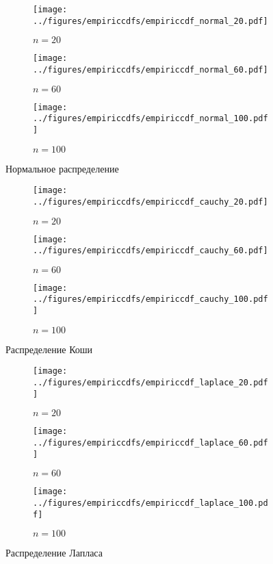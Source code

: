 \documentclass[12pt]{report}
\begin{document}
	\begin{figure}[H]
		\centering
		\begin{subfigure}[t]{.3\linewidth}
			\centering\texttt{[image: ../figures/empiriccdfs/empiriccdf\_normal\_20.pdf]}
			\caption*{$n = 20$}
		\end{subfigure}
		\begin{subfigure}[t]{.3\linewidth}
			\centering\texttt{[image: ../figures/empiriccdfs/empiriccdf\_normal\_60.pdf]}
			\caption*{$n = 60$}
		\end{subfigure}
		\begin{subfigure}[t]{.3\linewidth}
			\centering\texttt{[image: ../figures/empiriccdfs/empiriccdf\_normal\_100.pdf]}
			\caption*{$n = 100$}
		\end{subfigure}
		\caption{Нормальное распределение}
	\end{figure}
	\begin{figure}[H]
		\centering
		\begin{subfigure}[t]{.3\linewidth}
			\centering\texttt{[image: ../figures/empiriccdfs/empiriccdf\_cauchy\_20.pdf]}
			\caption*{$n = 20$}
		\end{subfigure}
		\begin{subfigure}[t]{.3\linewidth}
			\centering\texttt{[image: ../figures/empiriccdfs/empiriccdf\_cauchy\_60.pdf]}
			\caption*{$n = 60$}
		\end{subfigure}
		\begin{subfigure}[t]{.3\linewidth}
			\centering\texttt{[image: ../figures/empiriccdfs/empiriccdf\_cauchy\_100.pdf]}
			\caption*{$n = 100$}
		\end{subfigure}
		\caption{Распределение Коши}
	\end{figure}
	\begin{figure}[H]
		\centering
		\begin{subfigure}[t]{.3\linewidth}
			\centering\texttt{[image: ../figures/empiriccdfs/empiriccdf\_laplace\_20.pdf]}
			\caption*{$n = 20$}
		\end{subfigure}
		\begin{subfigure}[t]{.3\linewidth}
			\centering\texttt{[image: ../figures/empiriccdfs/empiriccdf\_laplace\_60.pdf]}
			\caption*{$n = 60$}
		\end{subfigure}
		\begin{subfigure}[t]{.3\linewidth}
			\centering\texttt{[image: ../figures/empiriccdfs/empiriccdf\_laplace\_100.pdf]}
			\caption*{$n = 100$}
		\end{subfigure}
		\caption{Распределение Лапласа}
	\end{figure}
\end{document}
